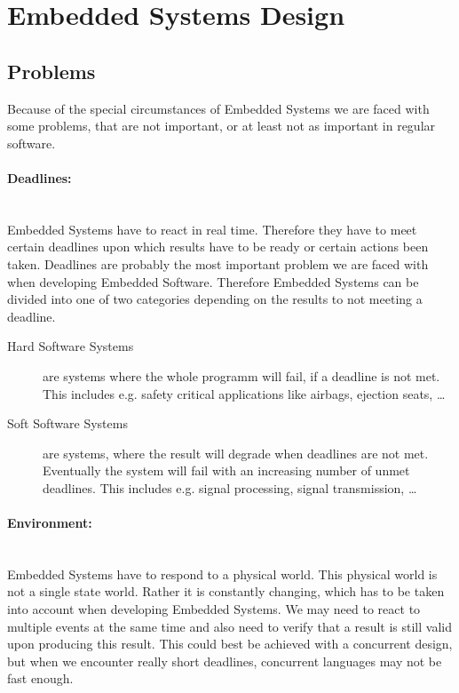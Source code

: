 \documentclass[10pt,a4paper,titlepage,draft]{scrartcl} %
\begin{document}
\section{Embedded Systems Design}
\subsection{Problems}
Because of the special circumstances of Embedded Systems we are faced with some problems, that are not important, or at least not as important in regular software.

\paragraph{Deadlines:} \ \\
Embedded Systems have to react in real time.
Therefore they have to meet certain deadlines upon which results have to be ready or certain actions been taken.
Deadlines are probably the most important problem we are faced with when developing Embedded Software.
Therefore Embedded Systems can be divided into one of two categories depending on the results to not meeting a deadline.

\begin{description}
	\item[Hard Software Systems] are systems where the whole programm will fail, if a deadline is not met.
	This includes e.g. safety critical applications like airbags, ejection seats, \dots
	\item[Soft Software Systems] are systems, where the result will degrade when deadlines are not met.
	Eventually the system will fail with an increasing number of unmet deadlines. This includes e.g. signal processing, signal transmission, \dots
\end{description}

\paragraph{Environment:} \ \\
Embedded Systems have to respond to a physical world. This physical world is not a single state world.
Rather it is constantly changing, which has to be taken into account when developing Embedded Systems.
We may need to react to multiple events at the same time and also need to verify that a result is still valid upon producing this result.
This could best be achieved with a concurrent design, but when we encounter really short deadlines, concurrent languages may not be fast enough.
\end{document}
